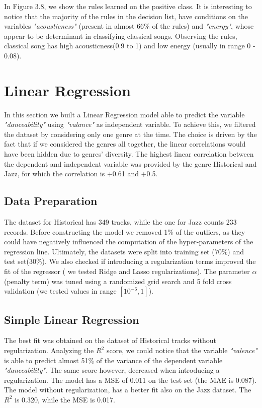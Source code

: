 In Figure 3.8, we show the rules learned on the positive class. It is interesting to notice that the majority of the rules in the decision list, have conditions on the variables \textit{"acousticness"} (present in almost 66\% of the rules) and \textit{"energy"}, whose appear to be determinant in classifying classical songs. Observing the rules, classical song has high acousticness(0.9 to 1) and low energy (usually in range 0 - 0.08). 



\section{Linear Regression}
In this section we built a Linear Regression model able to predict the variable \textit{"danceability"} using \textit{"valance"} as independent variable. To achieve this, we filtered the dataset by considering only one genre at the time. The choice is driven by the fact that if we considered the genres all together, the linear correlations would have been hidden due to genres' diversity. The highest linear correlation between the dependent and independent variable was provided by the genre Historical and Jazz, for which the correlation is +0.61 and +0.5.

\subsection{Data Preparation}
The dataset for Historical has 349 tracks, while the one for Jazz counts 233 records. Before constructing the model we removed 1\% of the outliers, as they could have negatively influenced the computation of the hyper-parameters of the regression line. Ultimately, the datasets were split into training set (70\%) and test set(30\%). We also checked if introducing a regularization terms improved the fit of the regressor ( we tested Ridge and Lasso regularizations). The parameter $\alpha$ (penalty term) was tuned using a randomized grid search and 5 fold cross validation (we tested values in range $[10^{-6},1]$).

\subsection{Simple Linear Regression}
The best fit was obtained on the dataset of Historical tracks without regularization. Analyzing the $R^2$ score, we could notice that the variable \textit{"valence"} is able to predict almost 51\% of the variance of the dependent variable \textit{"danceability"}. 
The same score however, decreased when introducing a regularization. The model has a MSE of 0.011 on the test set (the MAE is 0.087). 
The model without regularization, has a better fit also on the Jazz dataset. The $R^2$ is 0.320, while the MSE is 0.017. 


